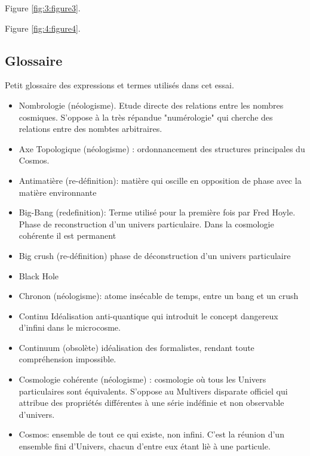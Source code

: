 \documentclass[a4paper,12pt]{article}
\begin{document}
Figure \ref{fig:3:figure3}.

Figure \ref{fig:4:figure4}.


\begin{appendix}


\section{Glossaire}

Petit glossaire des expressions et termes utilisés dans cet essai.

\begin{itemize}

\item Nombrologie (néologisme). Etude directe des relations entre les nombres cosmiques. S'oppose à la très répandue "numérologie" qui cherche des relations entre des nombtes arbitraires.
\item Axe Topologique (néologisme) : ordonnancement des structures principales du Cosmos.
\item Antimatière (re-définition): matière qui oscille en opposition de phase avec la matière environnante
\item Big-Bang (redefinition): Terme utilisé pour la première fois par Fred Hoyle. Phase de reconstruction d’un univers particulaire. Dans la cosmologie cohérente il est permanent
\item Big crush (re-définition) phase de déconstruction d’un univers particulaire
\item Black Hole
\item Chronon (néologisme): atome insécable de temps, entre un bang et un crush

\item Continu Idéalisation anti-quantique qui introduit le concept dangereux d'infini dans le microcosme.

\item Continuum (obsolète) idéalisation des formalistes, rendant toute compréhension impossible.

\item Cosmologie cohérente (néologisme) : cosmologie où tous les Univers particulaires sont équivalents. S’oppose au Multivers disparate officiel qui attribue des propriétés différentes à une série indéfinie et non observable d’univers.

\item Cosmos: ensemble de tout ce qui existe, non infini. C'est la réunion d'un ensemble fini d'Univers, chacun d'entre eux étant liè à une particule.



\end{itemize}
\end{appendix}
\end{document}
